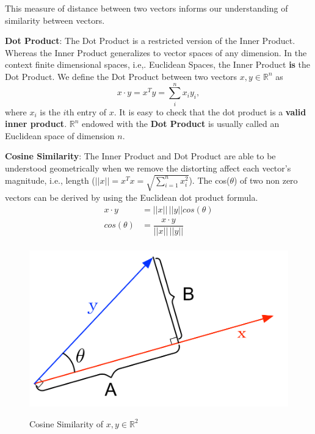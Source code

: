 \documentclass[12pt]{article}
\newenvironment{definition}[2][Definition]{\begin{trivlist}
\item[\hskip \labelsep {\bfseries #1}\hskip \labelsep {\bfseries #2}]}{\end{trivlist}}
\newenvironment{corollary}[2][Corollary]{\begin{trivlist}
\item[\hskip \labelsep {\bfseries #1}\hskip \labelsep {\bfseries #2}]}{\end{trivlist}}
\begin{document}
\begin{definition}{2.10}
\noindent
This measure of distance between two vectors informs our understanding of similarity between vectors.


\begin{corollary}{2.10.2} \textbf{Dot Product}: The Dot Product is a restricted version of the Inner Product. Whereas the Inner Product generalizes to vector spaces of any dimension.  In the context finite dimensional spaces, i.e,. Euclidean Spaces, the Inner Product \textbf{is} the Dot Product. We define the Dot Product between two vectors \(x,y \in \mathbb{R}^n\) as
\[x \cdot y = x^T y = \sum_i^n x_i y_i,\]
\noindent
where $x_i$ is the $i$th entry of $x$. It is easy to check that the dot product is a \textbf{valid inner product}. \(\mathbb{R}^n\) endowed with the \textbf{Dot Product} is usually called an Euclidean space of dimension $n$.
\end{corollary}


\begin{corollary}{2.10.3} \textbf{Cosine Similarity}: The Inner Product and Dot Product are able to be understood geometrically when we remove the distorting affect each vector's magnitude, i.e., length (\(||x|| = x^T x = \sqrt{\sum^n_{i=1}x^2_i}\)). The cos(\(\theta\)) of two non zero vectors can be derived by using the Euclidean dot product formula.
\begin{equation}
\begin{split}
    x \cdot y &= ||x||\,||y||cos(\theta) \\
    cos(\theta) &= \dfrac{x \cdot y}{||x||\,||y||} \\
\end{split}
\end{equation}

\begin{figure}[h]
\caption{Cosine Similarity of \(x,y \in \mathbb{R}^2\)}
\centering
\includegraphics[scale=0.5]{cosine}
\label{fig:cosine}
\end{figure}


\end{corollary}
\end{definition}
\end{document}
